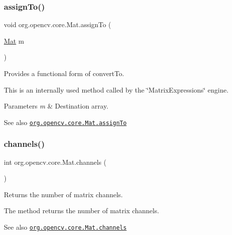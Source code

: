 \subsubsection{\texorpdfstring{assign\+To()}{assignTo()}\hspace{0.1cm}{\footnotesize\ttfamily [2/2]}}
{\footnotesize\ttfamily void org.\+opencv.\+core.\+Mat.\+assign\+To (\begin{DoxyParamCaption}\item[{\mbox{\hyperlink{classorg_1_1opencv_1_1core_1_1_mat}{Mat}}}]{m }\end{DoxyParamCaption})}

Provides a functional form of {\ttfamily convert\+To}.

This is an internally used method called by the \char`\"{}\+Matrix\+Expressions\char`\"{} engine.


\begin{DoxyParams}{Parameters}
{\em m} & Destination array.\\
\hline
\end{DoxyParams}
\begin{DoxySeeAlso}{See also}
\href{http://docs.opencv.org/modules/core/doc/basic_structures.html#mat-assignto}{\tt org.\+opencv.\+core.\+Mat.\+assign\+To} 
\end{DoxySeeAlso}
\mbox{\label{classorg_1_1opencv_1_1core_1_1_mat_ababb77842613942b86dad34ec909eacf}} 
\subsubsection{\texorpdfstring{channels()}{channels()}}
{\footnotesize\ttfamily int org.\+opencv.\+core.\+Mat.\+channels (\begin{DoxyParamCaption}{ }\end{DoxyParamCaption})}

Returns the number of matrix channels.

The method returns the number of matrix channels.

\begin{DoxySeeAlso}{See also}
\href{http://docs.opencv.org/modules/core/doc/basic_structures.html#mat-channels}{\tt org.\+opencv.\+core.\+Mat.\+channels} 
\end{DoxySeeAlso}
\mbox{\label{classorg_1_1opencv_1_1core_1_1_mat_ab323ee864f290b7ddbd804a6fbe76ae0}} 
